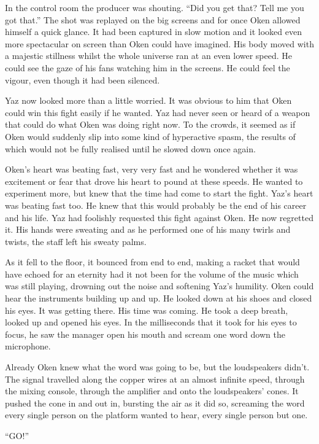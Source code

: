 In the control room the producer was shouting. ``Did you get that? Tell me you got that.'' The shot was replayed on the big screens and for once Oken allowed himself a quick glance. It had been captured in slow motion and it looked even more spectacular on screen than Oken could have imagined. His body moved with a majestic stillness whilst the whole universe ran at an even lower speed. He could see the gaze of his fans watching him in the screens. He could feel the vigour, even though it had been silenced.

Yaz now looked more than a little worried. It was obvious to him that Oken could win this fight easily if he wanted. Yaz had never seen or heard of a weapon that could do what Oken was doing right now. To the crowds, it seemed as if Oken would suddenly slip into some kind of hyperactive spasm, the results of which would not be fully realised until he slowed down once again.

Oken's heart was beating fast, very very fast and he wondered whether it was excitement or fear that drove his heart to pound at these speeds. He wanted to experiment more, but knew that the time had come to start the fight. Yaz's heart was beating fast too. He knew that this would probably be the end of his career and his life. Yaz had foolishly requested this fight against Oken. He now regretted it. His hands were sweating and as he performed one of his many twirls and twists, the staff left his sweaty palms.

As it fell to the floor, it bounced from end to end, making a racket that would have echoed for an eternity had it not been for the volume of the music which was still playing, drowning out the noise and softening Yaz's humility. Oken could hear the instruments building up and up. He looked down at his shoes and closed his eyes. It was getting there. His time was coming. He took a deep breath, looked up and opened his eyes. In the milliseconds that it took for his eyes to focus, he saw the manager open his mouth and scream one word down the microphone.

Already Oken knew what the word was going to be, but the loudspeakers didn't. The signal travelled along the copper wires at an almost infinite speed, through the mixing console, through the amplifier and onto the loudspeakers' cones. It pushed the cone in and out in, bursting the air as it did so, screaming the word every single person on the platform wanted to hear, every single person but one.

``GO!''



